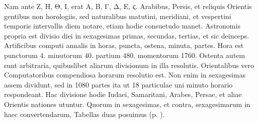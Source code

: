 Nam ante
\textgreek{Ζ, Η, Θ, Ι,} erat \textgreek{Α, Β, Γ, Δ, Ε, ϛ.}
Arabibus, Persis, et reliquis Orientis
gentibus non horologiis, sed
naturalibus matutini, meridiani,
et vespertini temporis
intervallis diem notare,
etiam hodie consuetudo manet.
Astronomis propria
est divisio diei in sexagesimas
primas, secundas, tertias,
et sic deinceps.
Artificibus
computi annalis in
horas, puncta, ostena, minuta,
partes.
Hora est punctorum
4. minutorum 40.
partium 480. momentorum
1760.
Ostenta autem sunt arbitraria,
quibuslibet aliarum
divisionum in illa resolutis.
Orientalibus vero Computatoribus
compendiosa horarum
resolutio est.
Non
enim in sexagesimas assem
dividunt, sed in 1080 partes
ita ut 18 particulae uni minuto
horario respondeant.
Hac divisione hodie Iudaei,
Samaritani, Arabes, Persae,
et aliae Orientis nationes utuntur.
%
Quorum in sexagesimas, et
contra, sexagesimarum in haec convertendarum, Tabellas duas posuimus
 (p. \pageref{tab:p006}).
\begin{table}
  
\end{table}
%
